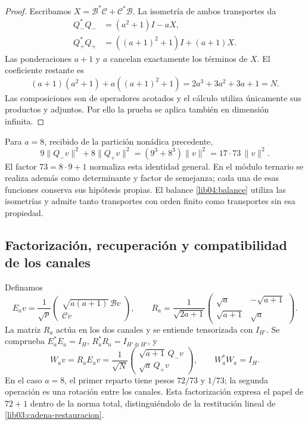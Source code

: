 \begin{proof}
Escribamos \(X=\mathcal B^*\mathcal C+\mathcal C^*\mathcal B\).
La isometría de ambos transportes da
\begin{align*}
 Q_-^*Q_-&=(a^2+1)I-aX,\\
 Q_+^*Q_+&=((a+1)^2+1)I+(a+1)X.
\end{align*}
Las ponderaciones \(a+1\) y \(a\) cancelan exactamente los términos
de \(X\). El coeficiente restante es
\[
 (a+1)(a^2+1)+a((a+1)^2+1)
 =2a^3+3a^2+3a+1=N.
\]
Las composiciones son de operadores acotados y el cálculo utiliza
únicamente sus productos y adjuntos. Por ello la prueba se aplica
también en dimensión infinita.
\end{proof}

Para \(a=8\), recibido de la partición nonádica precedente,
\begin{equation}
 9\|Q_-v\|^2+8\|Q_+v\|^2
 =(9^3+8^3)\|v\|^2=17\cdot73\,\|v\|^2.
 \label{lib04:balance-canonico}
\end{equation}
El factor \(73=8\cdot9+1\) normaliza esta identidad general. En el
módulo ternario se realiza además como determinante y factor de
semejanza; cada una de esas funciones conserva sus hipótesis propias.
El balance \eqref{lib04:balance} utiliza las isometrías y admite tanto
transportes con orden finito como transportes sin esa propiedad.

\subsection{Factorización, recuperación y compatibilidad de los canales}
\label{lib04:factorizacion}

Definamos
\begin{equation}
 E_av=\frac1{\sqrt p}
 \begin{pmatrix}\sqrt{a(a+1)}\,\mathcal Bv\\\mathcal Cv\end{pmatrix},
 \qquad
 R_a=\frac1{\sqrt{2a+1}}
 \begin{pmatrix}\sqrt a&-\sqrt{a+1}\\
                 \sqrt{a+1}&\sqrt a\end{pmatrix}.
 \label{lib04:factorizacion-er}
\end{equation}
La matriz \(R_a\) actúa en los dos canales y se entiende tensorizada
con \(I_{H'}\). Se comprueba
\(E_a^*E_a=I_H\), \(R_a^*R_a=I_{H'\oplus H'}\), y
\begin{equation}
 W_av=R_aE_av
 =\frac1{\sqrt N}
 \begin{pmatrix}\sqrt{a+1}\,Q_-v\\\sqrt a\,Q_+v\end{pmatrix},
 \qquad W_a^*W_a=I_H.
 \label{lib04:w}
\end{equation}
En el caso \(a=8\), el primer reparto tiene pesos \(72/73\) y
\(1/73\); la segunda operación es una rotación entre los canales.
Esta factorización expresa el papel de \(72+1\) dentro de la norma
total, distinguiéndolo de la restitución lineal de
\eqref{lib03:cadena-restauracion}.

